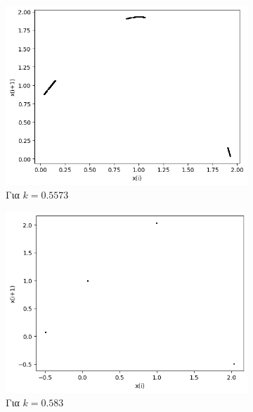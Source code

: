 \begin{figure}[ht]
\begin{subfigure}[b]{0.4\textwidth}
		\includegraphics[width=\textwidth]{LateX images/graphs q03/g11}
		\caption{Για $k=0.5573$}
		\label{f:k23}
	\end{subfigure}
	\hfill
	\begin{subfigure}[b]{0.4\textwidth}
		\centering
		\includegraphics[width=\textwidth]{LateX images/graphs q03/g12}
		\caption{Για $k=0.583$}
		\label{f:k24}
	\end{subfigure}
	\hfill
	\begin{subfigure}[b]{0.4\textwidth}
		\centering

\end{subfigure}
\end{figure}
